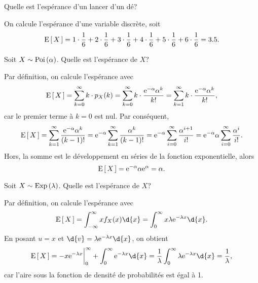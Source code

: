 \documentclass[11pt]{article}
\newcommand\e{%
	\ensuremath{%
		\mathrm{e}%
	}%
}%
\newcommand\Poi[1]{%
	\ensuremath{%
		\mathrm{Poi}\left(#1\right)%
	}%
}%
\newcommand\Exp[1]{%
	\ensuremath{%
		\mathrm{Exp}\left(#1\right)%
	}%
}%
\newcommand\Esp[1]{%
	\ensuremath{%
		\mathrm{E}\left[\,#1\,\right]%
	}%
}%
\begin{document}
\begin{exemple}
	Quelle est l'espérance d'un lancer d'un dé?

	On calcule l'espérance d'une variable discrète, soit
	\begin{equation*}
		\Esp{X}=
			1\cdot\frac{1}{6}+
			2\cdot\frac{1}{6}+
			3\cdot\frac{1}{6}+
			4\cdot\frac{1}{6}+
			5\cdot\frac{1}{6}+
			6\cdot\frac{1}{6}
		=3.5.
	\end{equation*}
\end{exemple}

\begin{exemple}
	Soit $X\sim\Poi{\alpha}$. Quelle est l'espérance de $X$?

	Par définition, on calcule l'espérance avec
	\begin{equation*}
		\Esp{X}
		=\sum_{k=0}^\infty k\cdot p_X(k)
		=\sum_{k=0}^\infty k\cdot\frac{\e^{-\alpha}\alpha^k}{k!}
		=\sum_{k=1}^\infty k\cdot\frac{\e^{-\alpha}\alpha^k}{k!},
	\end{equation*}
	car le premier terme à $k=0$ est nul. Par conséquent,
	\begin{equation*}
		\Esp{X}
		=\sum_{k=1}^\infty\frac{\e^{-\alpha}\alpha^k}{(k-1)!}
		=\e^{-\alpha}\sum_{k=1}^\infty\frac{\alpha^k}{(k-1)!}
		=\e^{-\alpha}\sum_{i=0}^\infty\frac{\alpha^{i+1}}{i!}
		=\e^{-\alpha}\alpha\sum_{i=0}^\infty\frac{\alpha^i}{i!}.
	\end{equation*}
	Hors, la somme est le développement en séries de la fonction exponentielle,
	alors
	\begin{equation*}
		\Esp{X}
		=\e^{-\alpha}\alpha\e^{\alpha}
		=\alpha.
	\end{equation*}
\end{exemple}

\pagebreak
\begin{exemple}
	Soit $X\sim\Exp{\lambda}$. Quelle est l'espérance de $X$?

	Par définition, on calcule l'espérance avec
	\begin{equation*}
		\Esp{X}
		=\int_{-\infty}^\infty xf_X(x)\d{x}
		=\int_0^\infty x\lambda\e^{-\lambda x}\d{x}.
	\end{equation*}
	En posant $u=x$ et $\d{v}=\lambda\e^{-\lambda x}\d{x}$, on obtient
	\begin{equation*}
		\Esp{X}
		=-x\e^{-\lambda x}\bigg\rvert_0^\infty
		+\int_0^\infty\e^{-\lambda x}\d{x}
		=\frac{1}{\lambda}\int_0^\infty\lambda\e^{-\lambda x}\d{x}
		=\frac{1}{\lambda},
	\end{equation*}
	car l'aire sous la fonction de densité de probabilités est égal à 1.
\end{exemple}
\end{document}

